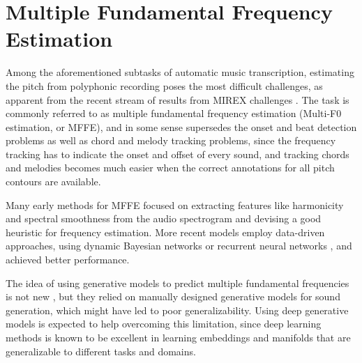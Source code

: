 \section{Multiple Fundamental Frequency Estimation}

Among the aforementioned subtasks of automatic music transcription, estimating the pitch from polyphonic recording poses the most difficult challenges, as apparent from the recent stream of results from MIREX challenges \cite{downie2014mirex}.
The task is commonly referred to as multiple fundamental frequency estimation (Multi-F0 estimation, or MFFE), and in some sense supersedes the onset and beat detection problems as well as chord and melody tracking problems,
since the frequency tracking has to indicate the onset and offset of every sound, and tracking chords and melodies becomes much easier when the correct annotations for all pitch contours are available.

Many early methods for MFFE \cite{klapuri2003multiple,emiya2010multipitch} focused on extracting features like harmonicity and spectral smoothness from the audio spectrogram and devising a good heuristic for frequency estimation.
More recent models employ data-driven approaches, using dynamic Bayesian networks \cite{raczynski2013dynamic} or recurrent neural networks \cite{sigtia2016endtoend}, and achieved better performance.

The idea of using generative models to predict multiple fundamental frequencies is not new \cite{dubois2005harmonic,cemgil2006generative}, but they relied on manually designed generative models for sound generation, which might have led to poor generalizability.
Using deep generative models is expected to help overcoming this limitation, since deep learning methods is known to be excellent in learning embeddings and manifolds that are generalizable to different tasks and domains.



